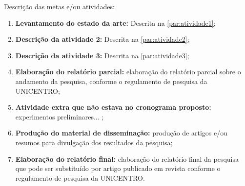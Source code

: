 Descrição das metas e/ou atividades:
\begin{enumerate}
    \item \textbf{Levantamento do estado da arte:} Descrita na \autoref{par:atividade1};
    \item \textbf{Descrição da atividade 2:} Descrita na \autoref{par:atividade2};
    \item \textbf{Descrição da atividade 3:} Descrita na \autoref{par:atividade3};
    \item \textbf{Elaboração do relatório parcial:} elaboração do relatório parcial sobre o andamento da pesquisa, conforme o regulamento de pesquisa da UNICENTRO;
    \item \textbf{Atividade extra que não estava no cronograma proposto:} experimentos preliminares... \lipsum[1][5-10];
    \item \textbf{Produção do material de disseminação:} produção de artigos e/ou resumos para divulgação dos resultados da pesquisa;
    \item \textbf{Elaboração do relatório final:} elaboração do relatório final da pesquisa que pode ser substituído por artigo publicado em revista conforme o regulamento de pesquisa da UNICENTRO.
\end{enumerate}